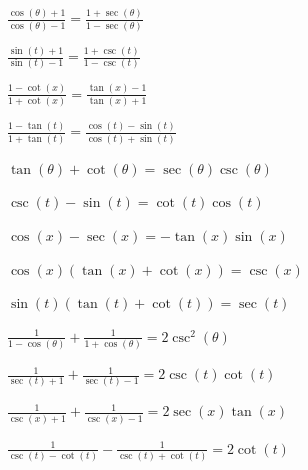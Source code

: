 \documentclass{ximera}
\begin{document}
\begin{question}
\begin{problem}
    $\frac{\cos(\theta) + 1}{\cos(\theta) - 1} = \frac{1 + \sec(\theta)}{1 - \sec(\theta)}$
\end{problem}

\begin{problem}
    $\frac{\sin(t) + 1}{\sin(t) - 1} = \frac{1 + \csc(t)}{1 - \csc(t)}$
\end{problem}

\begin{problem}
    $\frac{1 - \cot(x)}{1+ \cot(x)} = \frac{\tan(x) - 1}{\tan(x) + 1}$
\end{problem}

\begin{problem}
    $\frac{1 - \tan(t)}{1+ \tan(t)} = \frac{\cos(t) - \sin(t)}{\cos(t) + \sin(t)}$
\end{problem}

\begin{problem}
     $\tan(\theta) + \cot(\theta) = \sec(\theta)\csc(\theta)$
\end{problem}

\begin{problem}
    $\csc(t) - \sin(t) = \cot(t)\cos(t)$
\end{problem}

\begin{problem}
    $\cos(x) - \sec(x) = -\tan(x)\sin(x)$
\end{problem}

\begin{problem}
    $\cos(x)(\tan(x) + \cot(x)) = \csc(x)$
\end{problem}

\begin{problem}
    $\sin(t)(\tan(t) + \cot(t)) = \sec(t)$ 
\end{problem}

\begin{problem}
    $\frac{1}{1-\cos(\theta)} + \frac{1}{1+\cos(\theta)} = 2\csc^{2}(\theta)$
\end{problem}

\begin{problem}
    $\frac{1}{\sec(t) + 1} + \frac{1}{\sec(t)-1} = 2 \csc(t) \cot(t)$
\end{problem}

\begin{problem}
    $\frac{1}{\csc(x) + 1} + \frac{1}{\csc(x)-1} = 2 \sec(x) \tan(x)$
\end{problem}

\begin{problem}
    $\frac{1}{\csc(t)-\cot(t)} - \frac{1}{\csc(t) + \cot(t)} = 2 \cot(t)$
\end{problem}


\end{question}
\end{document}
